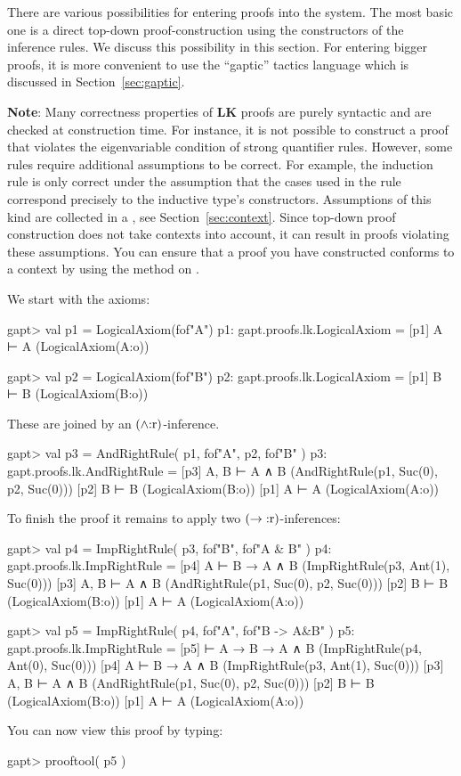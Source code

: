 \documentclass[a4paper,11pt]{book}
\newcommand{\impl}{\to} %
\renewcommand{\land}{\wedge}
\newcommand{\LK}{\textbf{LK}}
\newcommand{\mt}[1]{\textnormal{#1}}
\newcommand{\cli}[1]{{\ttfamily {#1}}}
\begin{document}
There are various possibilities for entering proofs into the system. The most
basic one is a direct top-down proof-construction using the constructors
of the inference rules. We discuss this possibility in this section. For
entering bigger proofs, it is more convenient to use the ``gaptic'' tactics
language which is discussed in Section~\ref{sec:gaptic}.

\textbf{Note}: Many correctness properties of {\LK} proofs are purely syntactic 
and are checked at construction time. For instance, it is not
possible to construct a proof that violates the eigenvariable condition
of strong quantifier rules. However, some rules require additional
assumptions to be correct. For example, the induction rule is only
correct under the assumption that the cases used in the rule
correspond precisely to the inductive type's constructors. Assumptions
of this kind are collected in a \cli{Context}, see Section~\ref{sec:context}.
Since top-down proof construction does not take contexts into account,
it can result in proofs violating these assumptions. You can ensure that
a proof you have constructed conforms to a context \cli{ctx} by using the
\cli{check} method on \cli{ctx}.

We start with the axioms:
%
\begin{clilisting}
gapt> val p1 = LogicalAxiom(fof"A")
p1: gapt.proofs.lk.LogicalAxiom =
[p1] A ⊢ A    (LogicalAxiom(A:o))

gapt> val p2 = LogicalAxiom(fof"B")
p2: gapt.proofs.lk.LogicalAxiom =
[p1] B ⊢ B    (LogicalAxiom(B:o))

\end{clilisting}
%
These are joined by an $(\land\mt{:r})$-inference.
\begin{clilisting}
gapt> val p3 = AndRightRule( p1, fof"A", p2, fof"B" )
p3: gapt.proofs.lk.AndRightRule =
[p3] A, B ⊢ A ∧ B    (AndRightRule(p1, Suc(0), p2, Suc(0)))
[p2] B ⊢ B    (LogicalAxiom(B:o))
[p1] A ⊢ A    (LogicalAxiom(A:o))

\end{clilisting}
%
To finish the proof it remains to apply two $(\impl\mt{:r})$-inferences:
%
\begin{clilisting}
gapt> val p4 = ImpRightRule( p3, fof"B", fof"A & B" )
p4: gapt.proofs.lk.ImpRightRule =
[p4] A ⊢ B → A ∧ B    (ImpRightRule(p3, Ant(1), Suc(0)))
[p3] A, B ⊢ A ∧ B    (AndRightRule(p1, Suc(0), p2, Suc(0)))
[p2] B ⊢ B    (LogicalAxiom(B:o))
[p1] A ⊢ A    (LogicalAxiom(A:o))

gapt> val p5 = ImpRightRule( p4, fof"A", fof"B -> A&B" )
p5: gapt.proofs.lk.ImpRightRule =
[p5]  ⊢ A → B → A ∧ B    (ImpRightRule(p4, Ant(0), Suc(0)))
[p4] A ⊢ B → A ∧ B    (ImpRightRule(p3, Ant(1), Suc(0)))
[p3] A, B ⊢ A ∧ B    (AndRightRule(p1, Suc(0), p2, Suc(0)))
[p2] B ⊢ B    (LogicalAxiom(B:o))
[p1] A ⊢ A    (LogicalAxiom(A:o))

\end{clilisting}
%
You can now view this proof by typing:
\begin{clilisting}
gapt> prooftool( p5 )

\end{clilisting}
\end{document}
